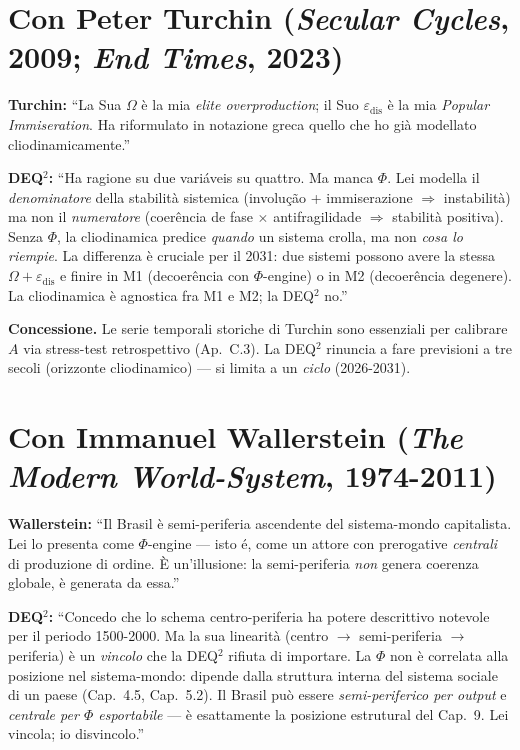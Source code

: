 \section{\texorpdfstring{Con Peter Turchin (\emph{Secular Cycles}, 2009;
\emph{End Times},
2023)}{Con Peter Turchin (Secular Cycles, 2009; End Times, 2023)}}\label{con-peter-turchin-secular-cycles-2009-end-times-2023}

\textbf{Turchin:} ``La Sua \(\Omega\) è la mia \emph{elite
overproduction}; il Suo \(\varepsilon_{\text{dis}}\) è la mia
\emph{Popular Immiseration}. Ha riformulato in notazione greca quello
che ho già modellato cliodinamicamente.''

\textbf{DEQ$^2$:} ``Ha ragione su due variáveis su quattro. Ma manca
\(\Phi\). Lei modella il \emph{denominatore} della stabilità sistemica
(involução + immiserazione \(\Rightarrow\) instabilità) ma non il
\emph{numeratore} (coerência de fase \(\times\) antifragilidade
\(\Rightarrow\) stabilità positiva). Senza \(\Phi\), la cliodinamica
predice \emph{quando} un sistema crolla, ma non \emph{cosa lo riempie}.
La differenza è cruciale per il 2031: due sistemi possono avere la
stessa \(\Omega + \varepsilon_{\text{dis}}\) e finire in M1 (decoerência
con \(\Phi\)-engine) o in M2 (decoerência degenere). La cliodinamica è
agnostica fra M1 e M2; la DEQ$^2$ no.''

\textbf{Concessione.} Le serie temporali storiche di Turchin sono
essenziali per calibrare \(A\) via stress-test retrospettivo (Ap.~C.3).
La DEQ$^2$ rinuncia a fare previsioni a tre secoli (orizzonte cliodinamico)
--- si limita a un \emph{ciclo} (2026-2031).



\section{\texorpdfstring{Con Immanuel Wallerstein (\emph{The Modern
World-System},
1974-2011)}{Con Immanuel Wallerstein (The Modern World-System, 1974-2011)}}\label{con-immanuel-wallerstein-the-modern-world-system-1974-2011}

\textbf{Wallerstein:} ``Il Brasil è semi-periferia ascendente del
sistema-mondo capitalista. Lei lo presenta come \(\Phi\)-engine --- isto é,
come un attore con prerogative \emph{centrali} di produzione di ordine.
È un'illusione: la semi-periferia \emph{non} genera coerenza globale, è
generata da essa.''

\textbf{DEQ$^2$:} ``Concedo che lo schema centro-periferia ha potere
descrittivo notevole per il periodo 1500-2000. Ma la sua linearità
(centro \(\to\) semi-periferia \(\to\) periferia) è un \emph{vincolo}
che la DEQ$^2$ rifiuta di importare. La \(\Phi\) non è correlata alla
posizione nel sistema-mondo: dipende dalla struttura interna del sistema
sociale di un paese (Cap.~4.5, Cap.~5.2). Il Brasil può essere
\emph{semi-periferico per output} e \emph{centrale per \(\Phi\)
esportabile} --- è esattamente la posizione estrutural del Cap.~9. Lei
vincola; io disvincolo.''

